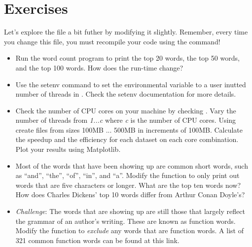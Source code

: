 \documentclass[letterpaper,10pt,openany,oneside]{sphinxmanual}
\begin{document}
\section{Exercises}
\label{phoenix/phoenix:exercises}
Let's explore the  file a bit futher by modifying it slightly.
Remember, every time you change this file, you must recompile your code using
the  command!
\begin{itemize}
\item {} 
Run the word count program to print the top 20 words, the top 50 words, and
the top 100 words. How does the run-time change?

\item {} 
Use the setenv command to set the  environmental variable to
a user inutted number of threads in . Check the setenv
documentation for more details.

\item {} 
Check the number of CPU cores on your machine by checking .
Vary the number of threads from \emph{1...c} where \emph{c} is the number of CPU cores.
Using  create files from sizes 100MB ... 500MB in increments
of 100MB. Calculate the speedup and the efficiency for each dataset on each
core combination. Plot your results using Matplotlib.

\item {} 
Most of the words that have been showing up are common short words, such as
``and'', ``the'', ``of'', ``in'', and ``a''. Modify the  function to only
print out words that are five characters or longer. What are the top ten
words now? How does Charles Dickens' top 10 words differ from Arthur Conan
Doyle's?

\item {} 
\emph{Challenge}: The words that are showing up are still those that largely
reflect the grammar of an author's writing. These are known as function words.
Modify the  function to \emph{exclude} any words that are function words.
A list of 321 common function words can be found at this link.

\end{itemize}



\renewcommand{\indexname}{Index}
\printindex
\end{document}
